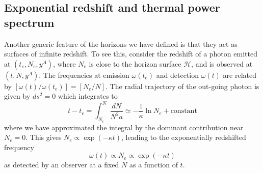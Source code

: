 \documentclass[12pt]{iopart}
\begin{document}
\subsection{Exponential redshift and thermal power spectrum}
 
 Another generic feature of the horizons we have defined  is that they act as surfaces of infinite redshift.
 To see this, consider the redshift of  a photon 
 emitted at $(t_e, N_e, y^A)$, 
   where $N_e$ is close to the horizon surface $\mathcal{H}$,  and is observed
   at $(t, N, y^A)$.  The frequencies at emission $\omega(t_e)$ and detection $\omega(t)$  are related by
   $[\omega(t)/\omega(t_e)]=[N_e/N] $. 
   The radial trajectory of the out-going photon is given by $ds^2=0$ which integrates to 
   \begin{equation}
   t-t_e =  \int_{N_e}^N \frac{dN}{N^2a} \simeq -\frac{1}{\kappa} \ln N_e + \textrm{constant}
   \label{photonpath}
   \end{equation}
  where we have approximated the integral by the dominant 
   contribution near $N_e =0$. This gives $N_e  \propto \exp(- \kappa t)$,
   leading to the exponentially redshifted frequency 
  \begin{equation}
 \omega(t)\propto N_e\propto \exp(-\kappa t)                                              \end{equation} 
 as detected by an observer at a fixed $N$ as a function of $t$.
 
\end{document}
